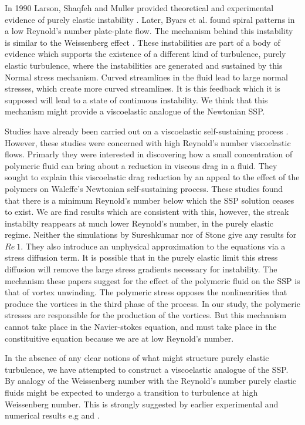 \documentclass{jfm}
\begin{document}
In 1990 Larson, Shaqfeh and Muller provided theoretical and experimental
evidence of purely elastic instability \cite{Larson1990}. Later, Byars et al.
\cite{ByarsWHENEVER} found spiral patterns in a low Reynold's number
plate-plate flow. The mechanism behind this instability is similar to the
Weissenberg effect \cite{WeissenbergLONGLONGAGO}. These instabilities are part
of a body of evidence which supports the existence of a different kind of
turbulence, purely elastic turbulence, where the instabilities are generated
and sustained by this Normal stress mechanism. Curved streamlines in the fluid
lead to large normal stresses, which create more curved streamlines. It is this
feedback which it is supposed will lead to a state of continuous instability.
We think that this mechanism might provide a viscoelastic analogue of the
Newtonian SSP.

Studies have already been carried out on a viscoelastic self-sustaining process
\cite{Stone2004, Stone2002, Sureshkumar1997}. However, these studies were
concerned with high Reynold's number viscoelastic flows. Primarly they were
interested in discovering how a small concentration of polymeric fluid can
bring about a reduction in viscous drag in a fluid. They sought to explain this
viscoelastic drag reduction by an appeal to the effect of the polymers on
Waleffe's Newtonian self-sustaining process. These studies found that there is
a minimum Reynold's number below which the SSP solution ceases to exist. We are
find results which are consistent with this, however, the streak instabilty
reappears at much lower Reynold's number, in the purely elastic regime. Neither
the simulations by Sureshkumar \cite{Sureshkumar1997} nor of Stone
\cite{Stone2004} give any results for $Re~1$. They also introduce an unphysical
approximation to the equations via a stress diffusion term. It is possible that
in the purely elastic limit this stress diffusion will remove the large stress
gradients necessary for instability. The mechanism these papers suggest for the
effect of the polymeric fluid on the SSP is that of vortex unwinding. The
polymeric stress opposes the nonlinearities that produce the vortices in the
third phase of the process. In our study, the polymeric stresses are
responsible for the production of the vortices. But this mechanism cannot take
place in the Navier-stokes equation, and must take place in the constituitive
equation because we are at low Reynold's number.

In the absence of any clear notions of what might structure purely elastic
turbulence, we have attempted to construct a viscoelastic analogue of the SSP.
By analogy of the Weissenberg number with the Reynold's number purely elastic
fluids might be expected to undergo a transition to turbulence at high
Weissenberg number. This is strongly suggested by earlier experimental and
numerical results e.g \cite{MorozovNONLINEARANALYSIS} and
\cite{taylorCouetteExperiments?}. 
\end{document}
